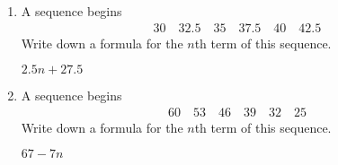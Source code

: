 \begin{enumerate} [leftmargin=0cm]
    \begin{envAnswer}[blankline=5,text=] $ 3n+11      $ \end{envAnswer}

\item A sequence begins \\
      \begin{align*}
            30  \quad 32.5   \quad  35  \quad  37.5  \quad  40  \quad  42.5
      \end{align*}       
    Write down a formula for the $n$th term of this sequence.       

    \begin{envAnswer}[blankline=5,text=] $ 2.5n+27.5      $ \end{envAnswer}
    
\item A sequence begins \\
      \begin{align*}
            60  \quad 53  \quad  46  \quad  39  \quad  32  \quad  25
      \end{align*}       
    Write down a formula for the $n$th term of this sequence.       

    \begin{envAnswer}[blankline=5,text=] $ 67-7n      $ \end{envAnswer}
    
\end{enumerate}

\clearpage

